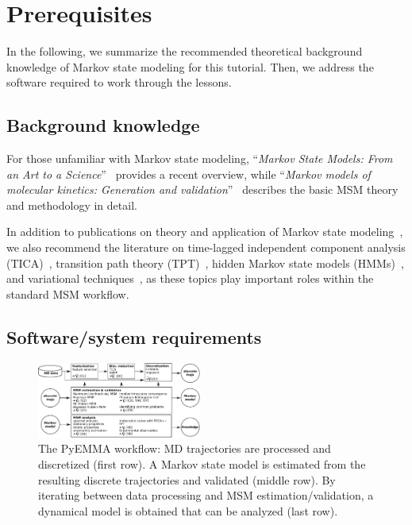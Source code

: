 \documentclass[9pt,tutorial]{livecoms}
\begin{document}
\section{Prerequisites}

In the following, we summarize the recommended theoretical background knowledge of Markov state modeling for this tutorial.
Then, we address the software required to work through the lessons.

\subsection{Background knowledge}
\label{sec:background}

For those unfamiliar with Markov state modeling, ``\emph{Markov State Models: From an Art to a Science}''~\cite{msm-brooke} provides a recent overview, while ``\emph{Markov models of molecular kinetics: Generation and validation}''~\cite{msm-jhp} describes the basic MSM theory and methodology in detail. 

In addition to publications on theory and application of Markov state modeling~\cite{msm-book,buchete-msm-2008,noe-tmat-sampling,bowman-msm-2009,noe-folding-pathways,sarich-msm-quality,noe-fingerprints,noe-dy-neut-scatt,Chodera2014,ben-rev-msm,simon-mech-mod-nmr,oom-feliks},
we also recommend the literature on time-lagged independent component analysis (TICA)~\cite{tica,tica3,tica2,kinetic-maps}, transition path theory (TPT)~\cite{weinan-tpt,metzner-msm-tpt},
hidden Markov state models (HMMs)~\cite{noe-proj-hid-msm,hmm-baum-welch-alg,hmm-tutorial}, and variational techniques~\cite{noe-vac,vamp-preprint,gmrq}, as these topics play important roles within the standard MSM workflow.

\subsection{Software/system requirements}

\begin{figure}
\includegraphics[width=0.48\textwidth]{figure_1}
\caption{The PyEMMA workflow: MD trajectories are processed and discretized (first row). A Markov state model is estimated from the resulting discrete trajectories and validated (middle row). By iterating between data processing and MSM estimation/validation, a dynamical model is obtained that can be analyzed (last row).}
\label{fig:workflowchart}
\end{figure}
\end{document}
